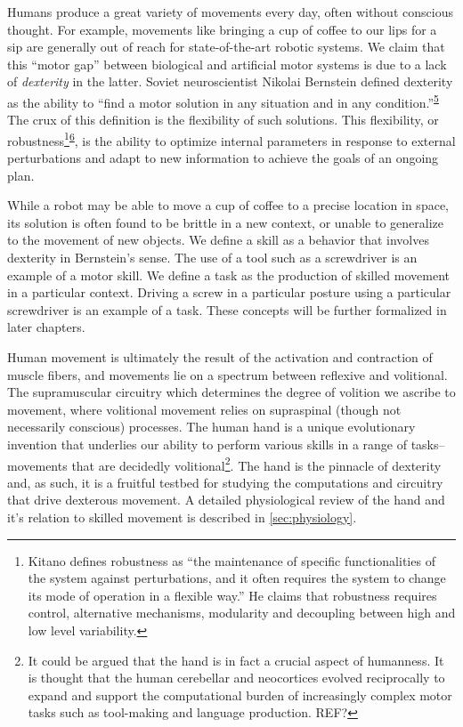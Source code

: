 \documentclass[
  a4paper,
]{article}
\begin{document}
Humans produce a great variety of movements every day, often without
conscious thought. For example, movements like bringing a cup of coffee
to our lips for a sip are generally out of reach for state-of-the-art
robotic systems. We claim that this ``motor gap'' between biological and
artificial motor systems is due to a lack of \emph{dexterity} in the
latter. Soviet neuroscientist Nikolai Bernstein defined dexterity as the
ability to ``find a motor solution in any situation and in any
condition.''\textsuperscript{\protect\hyperlink{ref-Bernstein1967}{5}}
The crux of this definition is the flexibility of such solutions. This
flexibility, or
robustness\footnote{Kitano defines robustness as ``the maintenance of
  specific functionalities of the system against perturbations, and it
  often requires the system to change its mode of operation in a
  flexible way.'' He claims that robustness requires control,
  alternative mechanisms, modularity and decoupling between high and low
  level variability.}\textsuperscript{\protect\hyperlink{ref-kitanoBiologicalRobustness2004}{6}},
is the ability to optimize internal parameters in response to external
perturbations and adapt to new information to achieve the goals of an
ongoing plan.

While a robot may be able to move a cup of coffee to a precise location
in space, its solution is often found to be brittle in a new context, or
unable to generalize to the movement of new objects. We define a skill
as a behavior that involves dexterity in Bernstein's sense. The use of a
tool such as a screwdriver is an example of a motor skill. We define a
task as the production of skilled movement in a particular context.
Driving a screw in a particular posture using a particular screwdriver
is an example of a task. These concepts will be further formalized in
later chapters.

Human movement is ultimately the result of the activation and
contraction of muscle fibers, and movements lie on a spectrum between
reflexive and volitional. The supramuscular circuitry which determines
the degree of volition we ascribe to movement, where volitional movement
relies on supraspinal (though not necessarily conscious) processes. The
human hand is a unique evolutionary invention that underlies our ability
to perform various skills in a range of tasks-- movements that are
decidedly volitional\footnote{It could be argued that the hand is in
  fact a crucial aspect of humanness. It is thought that the human
  cerebellar and neocortices evolved reciprocally to expand and support
  the computational burden of increasingly complex motor tasks such as
  tool-making and language production. REF?}. The hand is the pinnacle
of dexterity and, as such, it is a fruitful testbed for studying the
computations and circuitry that drive dexterous movement. A detailed
physiological review of the hand and it's relation to skilled movement
is described in \cref{sec:physiology}.
\end{document}

